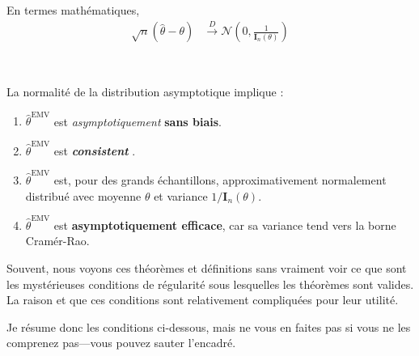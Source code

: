 \documentclass[10pt, french]{article}
\begin{document}
\begin{multicols*}{2}
\begin{definitionNOHFILLsub}
En termes mathématiques, 
\begin{align*}
	\sqrt{n}\left( \hat{\theta}	-	\theta \right)
	&\overset{D}{\rightarrow}
	\mathcal{N}\left( 0, \frac{1}{\bm{I}_{n}(\theta)} \right)
\end{align*}

\

La normalité de la distribution asymptotique implique :
\begin{enumerate}
	\item	$\hat{\theta}^{\text{EMV}}$ est \textit{asymptotiquement} \textbf{sans biais}.
	\item	$\hat{\theta}^{\text{EMV}}$ est \og \textit{\textbf{consistent}} \fg{}.
	\item	$\hat{\theta}^{\text{EMV}}$ est, pour des grands échantillons, approximativement normalement distribué avec moyenne $\theta$ et variance $1/\bm{I}_{n}(\theta)$.
	\item	$\hat{\theta}^{\text{EMV}}$ est \textbf{asymptotiquement efficace}, car sa variance tend vers la borne Cramér-Rao.
\end{enumerate}
\end{definitionNOHFILLsub}
	
\begin{rappel_enhanced}[Contexte]
Souvent, nous voyons ces théorèmes et définitions sans vraiment voir ce que sont les mystérieuses conditions de régularité sous lesquelles les théorèmes sont valides. La raison et que ces conditions sont relativement compliquées pour leur utilité. 

Je résume donc les conditions ci-dessous, mais ne vous en faites pas si vous ne les comprenez pas---vous pouvez sauter l'encadré.
\end{rappel_enhanced}


\end{multicols*}
\end{document}
